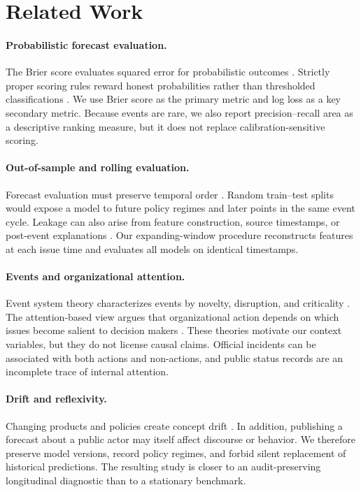 \section{Related Work}

\paragraph{Probabilistic forecast evaluation.}
The Brier score evaluates squared error for probabilistic outcomes \citep{brier1950verification}.
Strictly proper scoring rules reward honest probabilities rather than thresholded classifications
\citep{gneiting2007strictly}. We use Brier score as the primary metric and log loss as a key
secondary metric. Because events are rare, we also report precision--recall area as a descriptive
ranking measure, but it does not replace calibration-sensitive scoring.

\paragraph{Out-of-sample and rolling evaluation.}
Forecast evaluation must preserve temporal order \citep{tashman2000outofsample}. Random train--test
splits would expose a model to future policy regimes and later points in the same event cycle.
Leakage can also arise from feature construction, source timestamps, or post-event explanations
\citep{kapoor2023leakage}. Our expanding-window procedure reconstructs features at each issue time
and evaluates all models on identical timestamps.

\paragraph{Events and organizational attention.}
Event system theory characterizes events by novelty, disruption, and criticality
\citep{morgeson2015event}. The attention-based view argues that organizational action depends on
which issues become salient to decision makers \citep{ocasio1997attention}. These theories motivate
our context variables, but they do not license causal claims. Official incidents can be associated
with both actions and non-actions, and public status records are an incomplete trace of internal
attention.

\paragraph{Drift and reflexivity.}
Changing products and policies create concept drift \citep{gama2014survey}. In addition, publishing
a forecast about a public actor may itself affect discourse or behavior. We therefore preserve model
versions, record policy regimes, and forbid silent replacement of historical predictions. The
resulting study is closer to an audit-preserving longitudinal diagnostic than to a stationary
benchmark.
